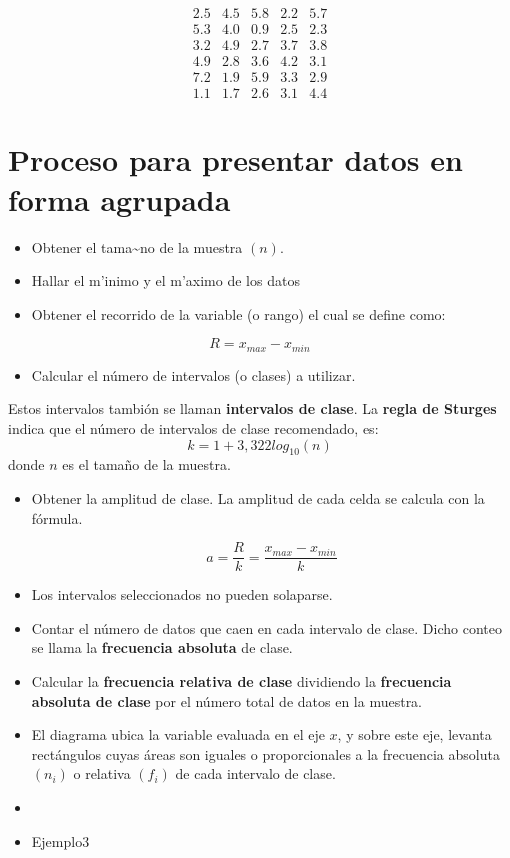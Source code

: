 \documentclass[
]{book}
\providecommand{\tightlist}{%
  \setlength{\itemsep}{0pt}\setlength{\parskip}{0pt}}
\theoremstyle{definition}
\theoremstyle{definition}
\theoremstyle{definition}
\theoremstyle{definition}
\theoremstyle{remark}
\begin{document}
\begin{equation}
\begin{matrix}
2.5 & 4.5 & 5.8 & 2.2 & 5.7\\
5.3 & 4.0 & 0.9 & 2.5 & 2.3\\
3.2 & 4.9 & 2.7 & 3.7 & 3.8\\
4.9 & 2.8 & 3.6 & 4.2 & 3.1\\
7.2 & 1.9 & 5.9 & 3.3 & 2.9\\
1.1 & 1.7 & 2.6 & 3.1 & 4.4
\end{matrix}
\end{equation}

\hypertarget{proceso-para-presentar-datos-en-forma-agrupada}{%
\section{Proceso para presentar datos en forma agrupada}\label{proceso-para-presentar-datos-en-forma-agrupada}}

\begin{itemize}
\tightlist
\item
  Obtener el tama\textasciitilde no de la muestra \((n)\).
\item
  Hallar el m'inimo y el m'aximo de los datos
\item
  Obtener el recorrido de la variable (o rango) el cual se define como:
\end{itemize}

\[
R=x_{max}-x_{min}
\]

\begin{itemize}
\tightlist
\item
  Calcular el número de intervalos (o clases) a utilizar.
\end{itemize}

Estos intervalos tambión se llaman \textbf{intervalos de clase}. La \textbf{regla de Sturges} indica que el número de intervalos de clase recomendado, es:
\[
        k=1+3,322log_{10}(n)
        \]
donde \(n\) es el tamaño de la muestra.

\begin{itemize}
\item
  Obtener la amplitud de clase. La amplitud de cada celda se calcula con la fórmula.

  \[
    a=\dfrac{R}{k}=\dfrac{x_{max}-x_{min}}{k}
    \]
\item
  Los intervalos seleccionados no pueden solaparse.
\item
  Contar el número de datos que caen en cada intervalo de clase. Dicho conteo se llama la \textbf{frecuencia absoluta} de clase.
\item
  Calcular la \textbf{frecuencia relativa de clase} dividiendo la \textbf{frecuencia absoluta de clase} por el número total de datos en la muestra.
\item
  El diagrama ubica la variable evaluada en el eje \(x\), y sobre este eje, levanta rectángulos cuyas áreas son iguales o proporcionales a la frecuencia absoluta \((n_i)\) o relativa \((f_i)\) de cada intervalo de clase.
\item
\item
  Ejemplo3
\end{itemize}
\end{document}
